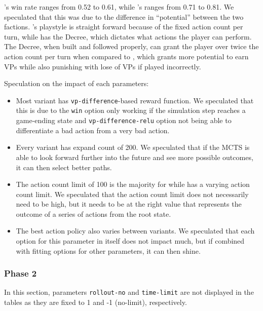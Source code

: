 
\Marquise{}'s win rate ranges from 0.52 to 0.61, while \Eyrie's ranges from 0.71 to 0.81. We speculated that this was due to the difference in ``potential'' between the two factions. \Marquise{}'s playstyle is straight forward because of the fixed action count per turn, while \Eyrie{} has the Decree, which dictates what actions the \Eyrie{} player can perform. The Decree, when built and followed properly, can grant the \Eyrie{} player over twice the action count per turn when compared to \Marquise{}, which grants more potential to earn VPs while also punishing with lose of VPs if played incorrectly.

Speculation on the impact of each parameters:
\begin{itemize}
    \item Most variant has \texttt{vp-difference}-based reward function. We speculated that this is due to the \texttt{win} option only working if the simulation step reaches a game-ending state and \texttt{vp-difference-relu} option not being able to differentiate a bad action from a very bad action.
    \item Every variant has expand count of 200. We speculated that if the MCTS is able to look forward further into the future and see more possible outcomes, it can then select better paths.
    \item The action count limit of 100 is the majority for \Marquise{} while \Eyrie{} has a varying action count limit. We speculated that the action count limit does not necessarily need to be high, but it needs to be at the right value that represents the outcome of a series of actions from the root state.
    \item The best action policy also varies between variants. We speculated that each option for this parameter in itself does not impact much, but if combined with fitting options for other parameters, it can then shine.
\end{itemize}

\subsubsection{Phase 2}


In this section, parameters \texttt{rollout-no} and \texttt{time-limit} are not displayed in the tables as they are fixed to 1 and -1 (no-limit), respectively.

